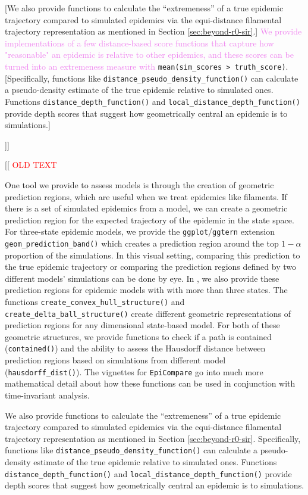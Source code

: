 \documentclass[
  shortnames]{jss}
\begin{document}
{[}We also provide functions to calculate the ``extremeness'' of a true
epidemic trajectory compared to simulated epidemics via the
equi-distance filamental trajectory representation as mentioned in
Section \ref{sec:beyond-r0-sir}.{]}
\textcolor{violet}{We provide implementations of a few distance-based score functions that capture how "reasonable" an epidemic is relative to other epidemics, and these scores can be turned into an extremeness measure with}
\texttt{mean(sim\_scores\ \textgreater{}\ truth\_score)}.
{[}Specifically, functions like
\texttt{distance\_pseudo\_density\_function()} can calculate a
pseudo-density estimate of the true epidemic relative to simulated ones.
Functions \texttt{distance\_depth\_function()} and
\texttt{local\_distance\_depth\_function()} provide depth scores that
suggest how geometrically central an epidemic is to simulations.{]}

{]}{]}

{[}{[}\textcolor{red}{ OLD TEXT}

One tool we provide to assess models is through the creation of
geometric prediction regions, which are useful when we treat epidemics
like filaments. If there is a set of simulated epidemics from a model,
we can create a geometric prediction region for the expected trajectory
of the epidemic in the state space. For three-state epidemic models, we
provide the \texttt{ggplot}/\texttt{ggtern} extension
\texttt{geom\_prediction\_band()} which creates a prediction region
around the top \(1-\alpha\) proportion of the simulations. In this
visual setting, comparing this prediction to the true epidemic
trajectory or comparing the prediction regions defined by two different
models' simulations can be done by eye. In , we also
provide these prediction regions for epidemic models with with more than
three states. The functions \texttt{create\_convex\_hull\_structure()}
and \texttt{create\_delta\_ball\_structure()} create different geometric
representations of prediction regions for any dimensional state-based
model. For both of these geometric structures, we provide functions to
check if a path is contained (\texttt{contained()}) and the ability to
assess the Hausdorff distance between prediction regions based on
simulations from different model (\texttt{hausdorff\_dist()}). The
vignettes for \texttt{EpiCompare} go into much more mathematical detail
about how these functions can be used in conjunction with time-invariant
analysis.

We also provide functions to calculate the ``extremeness'' of a true
epidemic trajectory compared to simulated epidemics via the
equi-distance filamental trajectory representation as mentioned in
Section \ref{sec:beyond-r0-sir}. Specifically, functions like
\texttt{distance\_pseudo\_density\_function()} can calculate a
pseudo-density estimate of the true epidemic relative to simulated ones.
Functions \texttt{distance\_depth\_function()} and
\texttt{local\_distance\_depth\_function()} provide depth scores that
suggest how geometrically central an epidemic is to simulations.
\end{document}
